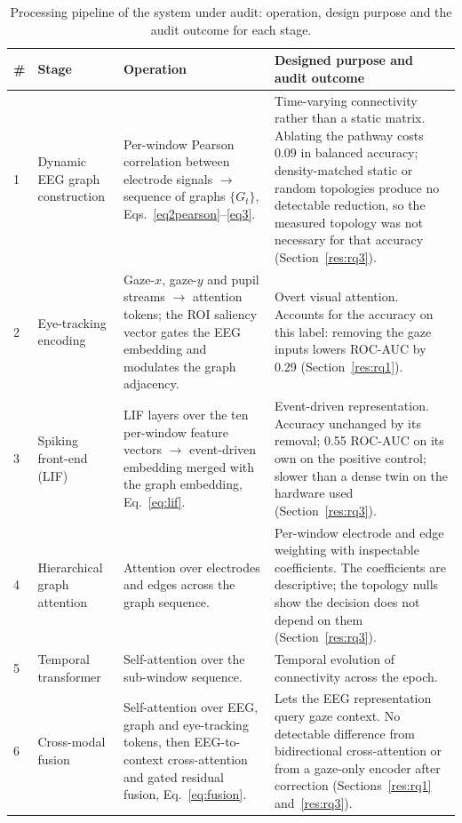 \documentclass[pdflatex,sn-basic,Numbered,twocolumn,iicol]{sn-jnl}
\theoremstyle{thmstyleone}%
\theoremstyle{thmstyletwo}%
\theoremstyle{thmstylethree}%
\begin{document}
\begin{table}[!htbp]
\caption{Processing pipeline of the system under audit: operation, design purpose and the audit outcome for each stage.}\label{tab_pipeline}
\footnotesize
\begin{tabular}{@{}p{0.3cm}p{2.9cm}p{5.2cm}p{5.2cm}@{}}
\toprule
\# & Stage & Operation & Designed purpose and audit outcome \\
\midrule
1 & Dynamic EEG graph construction & Per-window Pearson correlation between electrode signals $\rightarrow$ sequence of graphs $\{G_t\}$, Eqs.~\eqref{eq2pearson}--\eqref{eq3}. & Time-varying connectivity rather than a static matrix. Ablating the pathway costs 0.09 in balanced accuracy; density-matched static or random topologies produce no detectable reduction, so the measured topology was not necessary for that accuracy (Section~\ref{res:rq3}). \\
2 & Eye-tracking encoding & Gaze-$x$, gaze-$y$ and pupil streams $\rightarrow$ attention tokens; the ROI saliency vector gates the EEG embedding and modulates the graph adjacency. & Overt visual attention. Accounts for the accuracy on this label: removing the gaze inputs lowers ROC-AUC by 0.29 (Section~\ref{res:rq1}). \\
3 & Spiking front-end (LIF) & LIF layers over the ten per-window feature vectors $\rightarrow$ event-driven embedding merged with the graph embedding, Eq.~\eqref{eq:lif}. & Event-driven representation. Accuracy unchanged by its removal; 0.55 ROC-AUC on its own on the positive control; slower than a dense twin on the hardware used (Section~\ref{res:rq3}). \\
4 & Hierarchical graph attention & Attention over electrodes and edges across the graph sequence. & Per-window electrode and edge weighting with inspectable coefficients. The coefficients are descriptive; the topology nulls show the decision does not depend on them (Section~\ref{res:rq3}). \\
5 & Temporal transformer & Self-attention over the sub-window sequence. & Temporal evolution of connectivity across the epoch. \\
6 & Cross-modal fusion & Self-attention over EEG, graph and eye-tracking tokens, then EEG-to-context cross-attention and gated residual fusion, Eq.~\eqref{eq:fusion}. & Lets the EEG representation query gaze context. No detectable difference from bidirectional cross-attention or from a gaze-only encoder after correction (Sections~\ref{res:rq1} and~\ref{res:rq3}). \\

\end{tabular}
\end{table}
\end{document}
